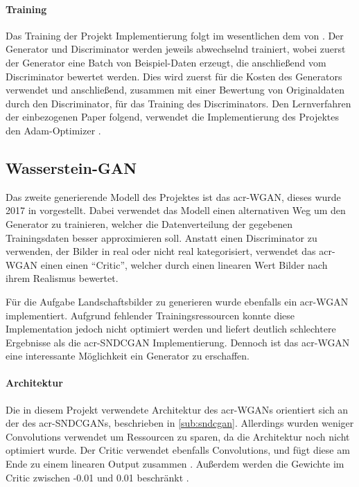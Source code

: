 \paragraph{Training} Das Training der Projekt Implementierung folgt im
wesentlichen dem von \citeauthor{goodfellow2014generative}
\cite{goodfellow2014generative}. Der Generator und Discriminator werden jeweils
abwechselnd trainiert, wobei zuerst der Generator eine Batch von Beispiel-Daten
erzeugt, die anschließend vom Discriminator bewertet werden. Dies wird zuerst
für die Kosten des Generators verwendet und anschließend, zusammen mit einer
Bewertung von Originaldaten durch den Discriminator, für das Training des
Discriminators. Den Lernverfahren der einbezogenen Paper
\cite{radford2015unsupervised,miyato2018spectral,kurach2018gan} folgend,
verwendet die Implementierung des Projektes den Adam-Optimizer
\cite{kingma2014adam}.
 
 \subsection{Wasserstein-GAN} %
 Das zweite generierende Modell des Projektes ist das \gls{acr-WGAN},
 dieses wurde 2017 in 
 \cite{arjovsky2017wasserstein} vorgestellt. Dabei verwendet das Modell einen
 alternativen Weg um den Generator zu trainieren, welcher die Datenverteilung
 der gegebenen Trainingsdaten besser approximieren soll. Anstatt einen
 Discriminator zu verwenden, der Bilder in real oder nicht real kategorisiert,
 verwendet das \gls{acr-WGAN} einen einen \enquote{Critic}, welcher durch einen
 linearen Wert Bilder nach ihrem Realismus bewertet. 
 
 Für die Aufgabe Landschaftsbilder zu generieren wurde ebenfalls ein
 \gls{acr-WGAN} implementiert. Aufgrund fehlender Trainingsressourcen konnte
 diese Implementation jedoch nicht optimiert werden und liefert deutlich
 schlechtere Ergebnisse als die \gls{acr-SNDCGAN} Implementierung. Dennoch ist
 das \gls{acr-WGAN} eine interessante Möglichkeit ein Generator zu erschaffen.  
 
 \paragraph{Architektur} Die in diesem Projekt verwendete Architektur des
 \gls{acr-WGAN}s orientiert sich an der des \gls{acr-SNDCGAN}s, beschrieben in
 \cref{sub:sndcgan}. Allerdings wurden weniger Convolutions verwendet um
 Ressourcen zu sparen, da die Architektur noch nicht optimiert wurde. Der Critic
 verwendet ebenfalls Convolutions, und fügt diese am Ende zu einem linearen Output zusammen \cite{brownlee_how_2019-1}.
 Außerdem werden die Gewichte im Critic zwischen -0.01 und 0.01 beschränkt
 \cite{arjovsky2017wasserstein}. 
 
